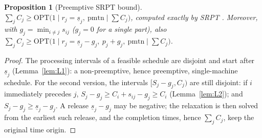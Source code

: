 \documentclass[11pt,a4paper]{article}
\theoremstyle{plain}
\newtheorem{proposition}{Proposition}
\theoremstyle{definition}
\theoremstyle{remark}
\begin{document}
\begin{proposition}[Preemptive SRPT bound]\label{prop:L5}
$\sum_jC_j\ge\mathrm{OPT}\bigl(1\mid r_j{=}\underline s_j,\ \mathrm{pmtn}\mid\sum C_j\bigr)$,
computed exactly by SRPT \cite{Schrage1968,Baker1974}. Moreover, with
$g_j=\min_{i\ne j}s_{ij}$ ($g_j=0$ for a single part), also
$\sum_jC_j\ge\mathrm{OPT}\bigl(1\mid r_j{=}\underline s_j-g_j,\ p_j{+}g_j,\ \mathrm{pmtn}\mid\sum C_j\bigr)$.
\end{proposition}
\begin{proof}
The processing intervals of a feasible schedule are disjoint and start after
$\underline s_j$ (Lemma~\ref{lem:L1}): a non-preemptive, hence preemptive, single-machine
schedule. For the second version, the intervals $[S_j-g_j,C_j)$ are still disjoint: if $i$
immediately precedes $j$, $S_j-g_j\ge C_i+s_{ij}-g_j\ge C_i$ (Lemma~\ref{lem:L2}); and
$S_j-g_j\ge\underline s_j-g_j$. A release $\underline s_j-g_j$ may be negative; the
relaxation is then solved from the earliest such release, and the completion times, hence
$\sum_jC_j$, keep the original time origin.
\end{proof}
\end{document}
